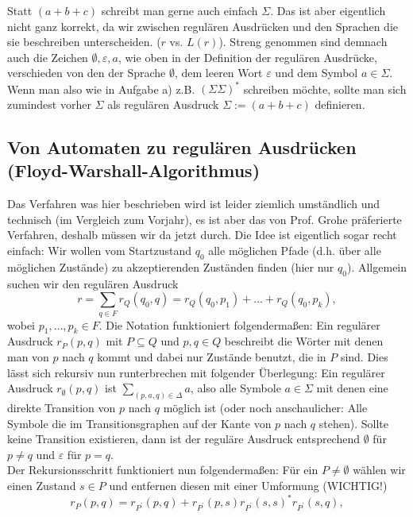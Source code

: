 \documentclass[11pt, a4paper]{article}
\begin{document}
Statt \( (a+b+c) \) schreibt man gerne auch einfach \( \Sigma \). Das ist aber eigentlich nicht ganz korrekt, da wir zwischen regulären Ausdrücken und den Sprachen die sie beschreiben unterscheiden. (\( r \) vs. \( L(r) \)). Streng genommen sind demnach auch die Zeichen \( \emptyset, \varepsilon, a \), wie oben in der Definition der regulären Ausdrücke, verschieden von den der Sprache \( \emptyset \), dem leeren Wort \( \varepsilon \) und dem Symbol \( a \in \Sigma \). Wenn man also wie in Aufgabe a) z.B. \( (\Sigma\Sigma)^\ast \) schreiben möchte, sollte man sich zumindest vorher \( \Sigma \) als regulären Ausdruck \( \Sigma := (a+b+c) \) definieren.


\subsection*{Von Automaten zu regulären Ausdrücken (Floyd-Warshall-Algorithmus)}
Das Verfahren was hier beschrieben wird ist leider ziemlich umständlich und technisch (im Vergleich zum Vorjahr), es ist aber das von Prof. Grohe präferierte Verfahren, deshalb müssen wir da jetzt durch. Die Idee ist eigentlich sogar recht einfach: Wir wollen vom Startzustand \( q_0 \) alle möglichen Pfade (d.h. über alle möglichen Zustände) zu akzeptierenden Zuständen finden (hier nur \( q_0 \)). Allgemein suchen wir den regulären Ausdruck
\[
	r = \sum_{q \in F} r_Q(q_0, q) = r_Q(q_0, p_1) + \ldots + r_Q(q_0, p_k),
\]
wobei \( p_1, \ldots, p_k \in F \). Die Notation funktioniert folgendermaßen: Ein regulärer Ausdruck \( r_P(p, q) \) mit \( P \subseteq Q \) und \( p, q \in Q \) beschreibt die Wörter mit denen man von \( p \) nach \( q \) kommt und dabei nur Zustände benutzt, die in \( P \) sind. Dies lässt sich rekursiv nun runterbrechen mit folgender Überlegung: Ein regulärer Ausdruck \( r_\emptyset(p, q) \) ist \( \sum_{(p, a, q) \in \Delta} a \), also alle Symbole \( a \in \Sigma \) mit denen eine direkte Transition von \( p \) nach \( q \) möglich ist (oder noch anschaulicher: Alle Symbole die im Transitionsgraphen auf der Kante von \( p \) nach \( q \) stehen). Sollte keine Transition existieren, dann ist der reguläre Ausdruck entsprechend \( \emptyset \) für \( p \neq q \) und \( \varepsilon \) für \( p = q \).\\
Der Rekursionsschritt funktioniert nun folgendermaßen: Für ein \( P \neq \emptyset \) wählen wir einen Zustand  \( s \in P \) und entfernen diesen mit einer Umformung (WICHTIG!)
\[
	r_P(p, q) = r_{P^\prime}(p, q) + r_{P^\prime}(p, s) r_{P^\prime}(s, s)^\ast r_{P^\prime}(s, q),
\]
\end{document}
